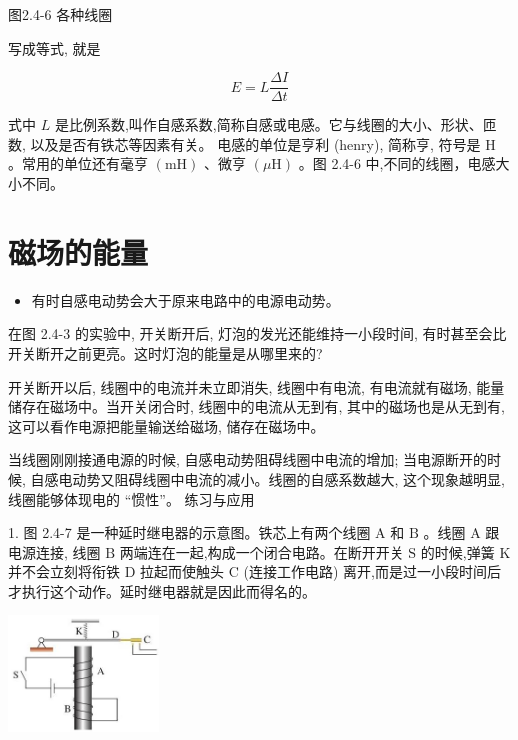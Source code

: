 \documentclass[10pt]{article}
\begin{document}
图2.4-6 各种线圈

写成等式, 就是

\[
E = L\frac{\Delta I}{\Delta t}
\]

式中 \(L\) 是比例系数,叫作自感系数,简称自感或电感。它与线圈的大小、形状、匝数, 以及是否有铁芯等因素有关。 电感的单位是亨利 (henry), 简称亨, 符号是 \(\mathrm{H}\) 。常用的单位还有毫亨 \(\left( \mathrm{{mH}}\right)\) 、微亨 \(\left( {\mu \mathrm{H}}\right)\) 。图 2.4-6 中,不同的线圈，电感大小不同。

\section*{磁场的能量}

\begin{mdframed}

\begin{itemize}
\item 有时自感电动势会大于原来电路中的电源电动势。
\end{itemize}

\end{mdframed}

在图 2.4-3 的实验中, 开关断开后, 灯泡的发光还能维持一小段时间, 有时甚至会比开关断开之前更亮。这时灯泡的能量是从哪里来的?

开关断开以后, 线圈中的电流并未立即消失, 线圈中有电流, 有电流就有磁场, 能量储存在磁场中。当开关闭合时, 线圈中的电流从无到有, 其中的磁场也是从无到有, 这可以看作电源把能量输送给磁场, 储存在磁场中。

当线圈刚刚接通电源的时候, 自感电动势阻碍线圈中电流的增加; 当电源断开的时候, 自感电动势又阻碍线圈中电流的减小。线圈的自感系数越大, 这个现象越明显, 线圈能够体现电的 “惯性”。 练习与应用

1. 图 2.4-7 是一种延时继电器的示意图。铁芯上有两个线圈 \(\mathrm{A}\) 和 \(\mathrm{B}\) 。线圈 \(\mathrm{A}\) 跟电源连接, 线圈 \(\mathrm{B}\) 两端连在一起,构成一个闭合电路。在断开开关 \(\mathrm{S}\) 的时候,弹簧 \(\mathrm{K}\) 并不会立刻将衔铁 \(\mathrm{D}\) 拉起而使触头 \(\mathrm{C}\) (连接工作电路) 离开,而是过一小段时间后才执行这个动作。延时继电器就是因此而得名的。

\begin{center}
\includegraphics[max width=0.3\textwidth]{images/01910e72-c5b7-7ed5-a6d4-fb3a5faefc32_49_273532.jpg}
\end{center}
\end{document}
